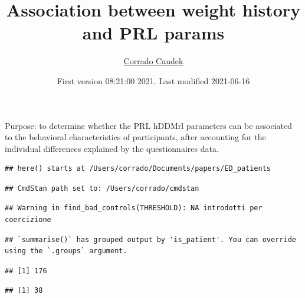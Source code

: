 \documentclass[
]{article}
\title{Association between weight history and PRL params}
\author{\href{https://ccaudek.github.io/}{Corrado Caudek}}
\date{First version 08:21:00 2021. Last modified 2021-06-16}
\begin{document}
\maketitle

Purpose: to determine whether the PRL hDDMrl parameters can be
associated to the behavioral characteristics of participants, after
accounting for the individual differences explained by the
questionnaires data.

\begin{verbatim}
## here() starts at /Users/corrado/Documents/papers/ED_patients
\end{verbatim}

\begin{verbatim}
## CmdStan path set to: /Users/corrado/cmdstan
\end{verbatim}

\begin{verbatim}
## Warning in find_bad_controls(THRESHOLD): NA introdotti per coercizione
\end{verbatim}

\begin{verbatim}
## `summarise()` has grouped output by 'is_patient'. You can override using the `.groups` argument.
\end{verbatim}

\begin{verbatim}
## [1] 176
\end{verbatim}

\begin{verbatim}
## [1] 38
\end{verbatim}
\end{document}
